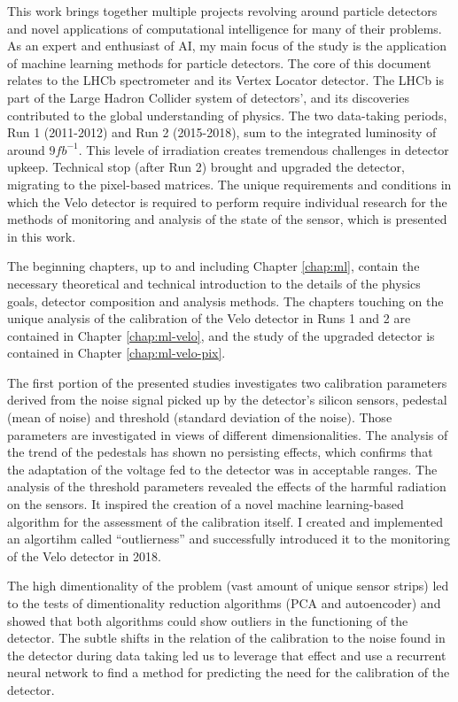 This work brings together multiple projects revolving around particle detectors and novel applications of computational intelligence for many of their problems.
As an expert and enthusiast of AI, my main focus of the study is the application of machine learning methods for particle detectors.
The core of this document relates to the LHCb spectrometer and its Vertex Locator detector.
The LHCb is part of the Large Hadron Collider system of detectors', and its discoveries contributed to the global understanding of physics.
The two data-taking periods, Run 1 (2011-2012) and Run 2 (2015-2018), sum to the integrated luminosity of around $9fb^{-1}$.
This levele of irradiation creates tremendous challenges in detector upkeep.
Technical stop (after Run 2) brought and upgraded the detector, migrating to the pixel-based matrices.
The unique requirements and conditions in which the Velo detector is required to perform require individual research for the methods of monitoring and analysis of the state of the sensor, which is presented in this work.

The beginning chapters, up to and including Chapter \ref{chap:ml}, contain the necessary theoretical and technical introduction to the details of the physics goals, detector composition and analysis methods.
The chapters touching on the unique analysis of the calibration of the Velo detector in Runs 1 and 2 are contained in Chapter \ref{chap:ml-velo}, and the study of the upgraded detector is contained in Chapter \ref{chap:ml-velo-pix}.

The first portion of the presented studies investigates two calibration parameters derived from the noise signal picked up by the detector's silicon sensors, pedestal (mean of noise) and threshold (standard deviation of the noise). Those parameters are investigated in views of different dimensionalities.
The analysis of the trend of the pedestals has shown no persisting effects, which confirms that the adaptation of the voltage fed to the detector was in acceptable ranges.
The analysis of the threshold parameters revealed the effects of the harmful radiation on the sensors. It inspired the creation of a novel machine learning-based algorithm for the assessment of the calibration itself.
I created and implemented an algortihm called ``outlierness'' and successfully introduced it to the monitoring of the Velo detector in 2018.

The high dimentionality of the problem (vast amount of unique sensor strips) led to the tests of dimentionality reduction algorithms (PCA and autoencoder) and showed that both algorithms could show outliers in the functioning of the detector.
The subtle shifts in the relation of the calibration to the noise found in the detector during data taking led us to leverage that effect and use a recurrent neural network to find a method for predicting the need for the calibration of the detector.

